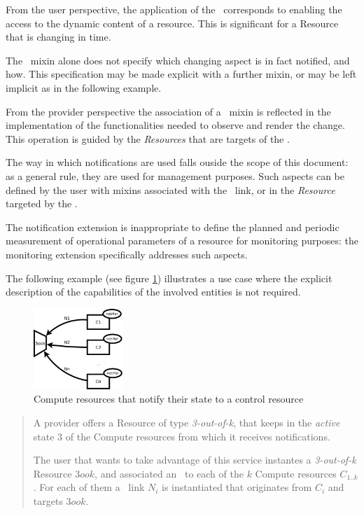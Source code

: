 \documentclass[10pt,a4paper]{article}
\begin{document}
From the user perspective, the application of the \smx\ corresponds to enabling the access to the dynamic content of a resource. This is significant for a Resource that is changing in time.

The \smx\ mixin alone does not specify which changing aspect is in fact notified, and how. This specification may be made explicit with a further mixin, or may be left implicit as in the following example.

From the provider perspective the association of a \smx\ mixin is reflected in the implementation of the functionalities needed to observe and render the change. This operation is guided by the {\em Resources} that are targets of the \ntfl.

The way in which notifications are used falls ouside the scope of this document: as a general rule, they are used for management purposes. Such aspects can be defined by the user with mixins associated with the \ntfl\ link, or in the {\em Resource} targeted by the \ntfl.

The notification extension is inappropriate to define the planned and periodic measurement of operational parameters of a resource for monitoring purposes: the monitoring extension \cite{occi:monitoring} specifically addresses such aspects.

The following example (see figure \ref{fig:example}) illustrates a use case where the explicit description of the capabilities of the involved entities is not required.

\begin{figure}
\includegraphics[width=0.3\textwidth]{figs/notificationExample.pdf}
\caption{Compute resources that notify their state to a control resource \label{fig:example}}
\end{figure}

\begin{quote}
A provider offers a Resource of type {\em 3-out-of-k}, that keeps in the {\em active} state 3 of the Compute resources from which it receives notifications.

The user that wants to take advantage of this service instantes a {\em 3-out-of-k} Resource $3ook$, and associated an \smx\ to each of the $k$ Compute resources $C_{1..k}$. For each of them a \ntfl\ link $N_i$ is instantiated that originates from $C_i$ and targets $3ook$.
\end{quote}
\end{document}
